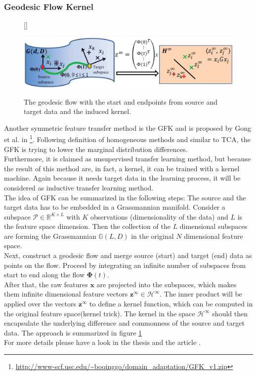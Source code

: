 \subsubsection{Geodesic Flow Kernel}
\begin{figure}[t]
	\centering
	[\FBwidth]
	{\caption[Summary of Geodesic Flow Kernel Approach]{The geodesic flow with the start and endpoints from source and target data and the induced kernel.\cite{Gong.}}}
	{\includegraphics[width=\linewidth]{figures/GFKApproach.png}\label{FigGFKApproach}}
\end{figure}
Another symmetric feature transfer method is the \ac{GFK} and is proposed by Gong et al. in \cite{Gong.}\footnote{\url{http://www-scf.usc.edu/~boqinggo/domain\_adaptation/GFK\_v1.zip}}.
Following definition of homogeneous methods and similar to \acs{TCA}, the \acl{GFK} is trying to lower the marginal distribution differences.\cite[p. 13]{Weiss.2016}\\
Furthermore, it is claimed as unsupervised transfer learning method, but because the result of this method are, in fact, a kernel, it can be trained with a kernel machine.\cite{Gong.}
Again because it needs target data in the learning process, it will be considered as inductive transfer learning method.\\
The idea of \acs{GFK} can be summarized in the following steps:
The source and the target data has to be embedded in a Grassmannian manifold.
Consider a subspace $\mathcal{P} \in \mathbb{R}^{K \times L}$ with $K$ observations (dimensionality of the data) and $L$ is the feature space dimension.
Then the collection of the $L$ dimensional subspaces are forming the Grassmannian $\mathbb{G}(L, D)$ in the original $N$ dimensional feature space.\cite{Gong.}\\
Next, construct a geodesic flow and merge source (start) and target (end) data as points on the flow.
Proceed by integrating an infinite number of subspaces from start to end along the flow $\boldsymbol{\Phi}(t)$.\cite{Gong.}\\
After that, the raw features $\mathbf{x}$ are projected into the subspaces, which makes them infinite dimensional feature vectors $\mathbf{z}^\infty \in \mathcal{H}^\infty$.
The inner product will be applied over the vectors $\mathbf{z}^\infty$ to define a kernel function, which can be computed in the original feature space(kernel trick).
The kernel in the space $\mathcal{H}^\infty$ should then encapsulate the underlying difference and commonness of the source and target data.\cite{Gong.} The approach is summarized in figure \ref{FigGFKApproach}\\
For more details please have a look in the thesis \cite[p. 45;110-113]{Gong.2015} and the article \cite{Gong.}.
